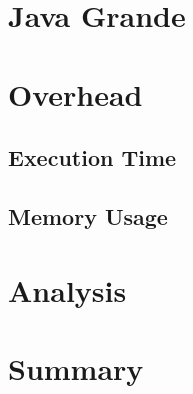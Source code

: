 \section{Java Grande} \label{sec:results/grande}

\section{Overhead} \label{sec:results/overhead}
	\subsection{Execution Time} \label{sec:results/overhead/time}
	
	\subsection{Memory Usage} \label{sec:results/overhead/memory}

\section{Analysis} \label{sec:results/analysis}

\section{Summary} \label{sec:results/summary}